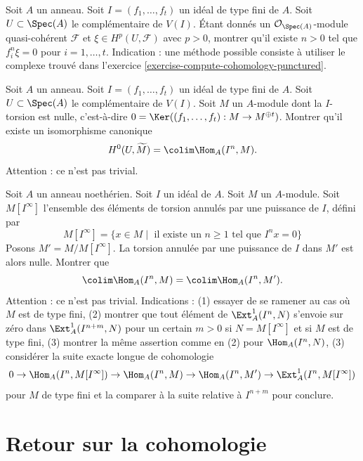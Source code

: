\begin{exercise}
\label{exercise-kill-cohomology-complement}
Soit $A$ un anneau. Soit $I = (f_1, \ldots, f_t)$ un idéal de type fini
de $A$. Soit $U \subset \Spec(A)$ le complémentaire de $V(I)$.
Étant donnés un $\mathcal{O}_{\Spec(A)}$-module quasi-cohérent $\mathcal{F}$
et $\xi \in H^p(U, \mathcal{F})$ avec $p > 0$, montrer qu'il existe
$n > 0$ tel que $f_i^n \xi = 0$ pour $i = 1, \ldots, t$.
Indication : une méthode possible consiste à utiliser le complexe
trouvé dans l'exercice \ref{exercise-compute-cohomology-punctured}.
\end{exercise}

\begin{exercise}
\label{exercise-h0-complement}
Soit $A$ un anneau. Soit $I = (f_1, \ldots, f_t)$ un
idéal de type fini de $A$. Soit $U \subset \Spec(A)$
le complémentaire de $V(I)$. Soit $M$ un $A$-module
dont la $I$-torsion est nulle, c'est-à-dire
$0 = \Ker((f_1, \ldots, f_t) : M \to M^{\oplus t})$.
Montrer qu'il existe un isomorphisme canonique
$$
H^0(U, \widetilde{M}) = \colim \Hom_A(I^n, M).
$$
Attention : ce n'est pas trivial.
\end{exercise}

\begin{exercise}
\label{exercise-Noetherian}
Soit $A$ un anneau noethérien. Soit $I$ un idéal de $A$.
Soit $M$ un $A$-module. Soit $M[I^\infty]$ l'ensemble des éléments de
torsion annulés par une puissance de $I$, défini par
$$
M[I^\infty] = \{x \in M \mid
\text{ il existe un }n \geq 1\text{ tel que }I^nx = 0\}
$$
Posons $M' = M/M[I^\infty]$. La torsion annulée par une puissance de $I$ dans $M'$ est alors nulle.
Montrer que
$$
\colim \Hom_A(I^n, M) = \colim \Hom_A(I^n, M').
$$
Attention : ce n'est pas trivial. Indications : (1) essayer de se ramener au cas où $M$ est de type fini,
(2) montrer que tout élément de $\Ext^1_A(I^n, N)$
s'envoie sur zéro dans $\Ext^1_A(I^{n + m}, N)$ pour un certain $m > 0$
si $N = M[I^\infty]$ et si $M$ est de type fini, (3) montrer la même assertion
comme en (2) pour $\Hom_A(I^n, N)$, (3) considérer la suite exacte longue
de cohomologie
$$
0 \to \Hom_A(I^n, M[I^\infty]) \to \Hom_A(I^n, M) \to \Hom_A(I^n, M')
\to \Ext^1_A(I^n, M[I^\infty])
$$
pour $M$ de type fini et la comparer à la suite relative à $I^{n + m}$ pour conclure.
\end{exercise}








\section{Retour sur la cohomologie}
\label{section-more-more-cohomology}


